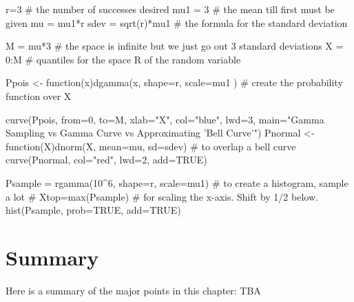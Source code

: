 \documentclass[10pt,]{book}
\numberwithin{equation}{section}
\begin{document}
%
\par
\hypertarget{p-1159}{}%
\leavevmode%
\begin{sageinput}
r=3                # the number of successes desired
mu1 = 3            # the mean till first must be given
mu = mu1*r
sdev = sqrt(r)*mu1  # the formula for the standard deviation

M = mu*3   # the space is infinite but we just go out 3 standard deviations
X = 0:M    # quantiles for the space R of the random variable 

Ppois <- function(x){dgamma(x, shape=r, scale=mu1 )}  # create the probability function over X

curve(Ppois, from=0, to=M, xlab="X", col="blue", lwd=3,
 main="Gamma Sampling vs Gamma Curve vs Approximating 'Bell Curve'") 
Pnormal <- function(X){dnorm(X, mean=mu, sd=sdev)}   # to overlap a bell curve
curve(Pnormal, col="red", lwd=2, add=TRUE) 

Psample = rgamma(10^6, shape=r, scale=mu1)  # to create a histogram, sample a lot
# Xtop=max(Psample)          # for scaling the x-axis. Shift by 1/2 below.
hist(Psample, prob=TRUE, add=TRUE)
\end{sageinput}
%
%
%
\typeout{************************************************}
\typeout{************************************************}
%
\section[{Summary}]{Summary}\label{section-55}
\hypertarget{p-1160}{}%
Here is a summary of the major points in this chapter:%
\hypertarget{p-1161}{}%
TBA%
%
%
\typeout{************************************************}
\typeout{************************************************}
%
\end{document}

